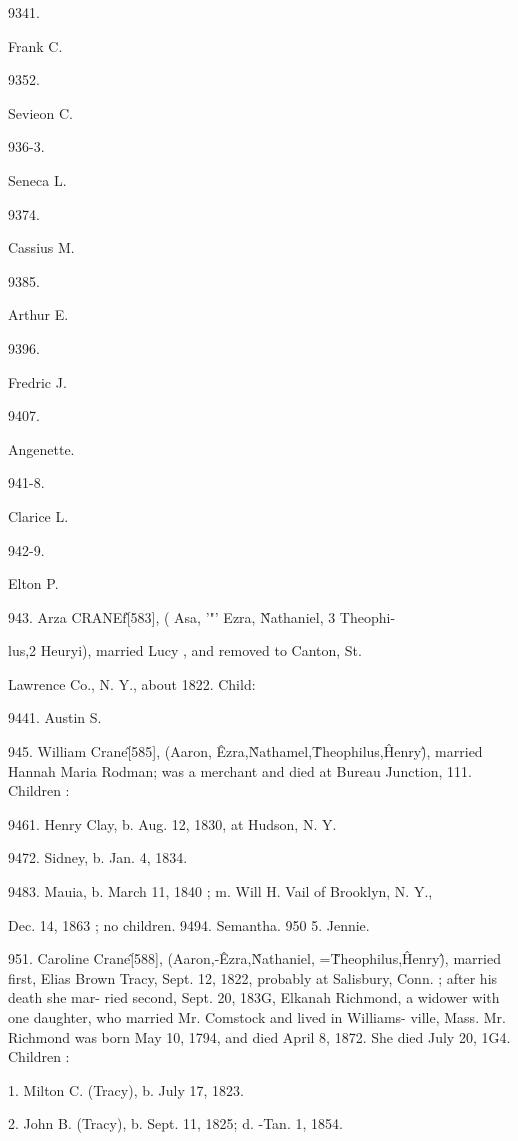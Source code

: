 \documentclass{book}
\begin{document}
9341. 


Frank C. 


9352. 


Sevieon C. 


936-3. 


Seneca L. 


9374. 


Cassius M. 


9385. 


Arthur E. 


9396. 


Fredric J. 


9407. 


Angenette. 


941-8. 


Clarice L. 


942-9. 


Elton P. 



943. Arza CRANEf\^ [583], ( Asa, '"' Ezra, \^ Nathaniel, 3 Theophi- 

lus,2 Heuryi), married Lucy , and removed to Canton, St. 

Lawrence Co., N. Y., about 1822. Child: 



9441. Austin S. 




945. William Crane\^ [585], (Aaron, \^ Ezra,\^ Nathamel,\^ 
Theophilus,\^ Henry\^), married Hannah Maria Rodman; was a 
merchant and died at Bureau Junction, 111. Children : 

9461. Henry Clay, b. Aug. 12, 1830, at Hudson, N. Y. 

9472. Sidney, b. Jan. 4, 1834. 

9483. Mauia, b. March 11, 1840 ; m. Will H. Vail of Brooklyn, N. Y., 

Dec. 14, 1863 ; no children. 
9494. Semantha. 
950  5. Jennie. 

951. Caroline Crane\^ [588], (Aaron,-\^ Ezra,\^ Nathaniel, =\^ 
Theophilus,\^ Henry\^), married first, Elias Brown Tracy, Sept. 
12, 1822, probably at Salisbury, Conn. ; after his death she mar- 
ried second, Sept. 20, 183G, Elkanah Richmond, a widower with 
one daughter, who married Mr. Comstock and lived in Williams- 
ville, Mass. Mr. Richmond was born May 10, 1794, and died 
April 8, 1872. She died July 20, 1G4. Children : 

1. Milton C. (Tracy), b. July 17, 1823. 

2. John B. (Tracy), b. Sept. 11, 1825; d. -Tan. 1, 1854. 
\end{document}
